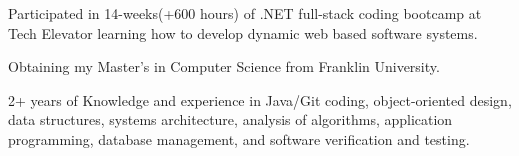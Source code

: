 \begin{cventries}
  \cventry
    {}
    {}
    {}
    {}
    {
      \vspace{-7mm}\begin{cvitems}
 \item {Participated in 14-weeks(+600 hours) of .NET full-stack coding bootcamp at Tech Elevator learning how to develop dynamic web based software systems.}
 \item {Obtaining my Master's in Computer Science from Franklin University.}
        \item {2+ years of Knowledge and experience in Java/Git coding, object-oriented design, data structures, systems architecture, analysis of algorithms, application programming, database management, and software verification and testing.}     
      \end{cvitems}
    }
\end{cventries}
